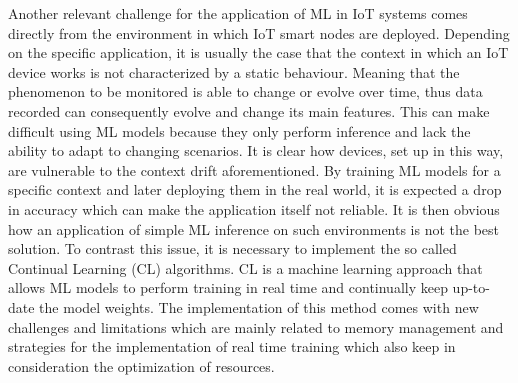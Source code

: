 \documentclass[12pt]{report}
\begin{document}
Another relevant challenge for the application of ML in IoT systems comes directly from the environment in which IoT smart nodes are deployed. Depending on the specific application, it is usually the case that the context in which an IoT device works is not characterized by a static behaviour. Meaning that the phenomenon to be monitored is able to change or evolve over time, thus data recorded can consequently evolve and change its main features. This can make difficult using ML models because they only perform inference and lack the ability to adapt to changing scenarios. It is clear how devices, set up in this way, are vulnerable to the context drift aforementioned.
By training ML models for a specific context and later deploying them in the real world, it is expected a drop in accuracy which can make the application itself not reliable. It is then obvious how an application of simple ML inference on such environments is not the best solution. To contrast this issue, it is necessary to implement the so called Continual Learning (CL) algorithms. CL is a machine learning approach that allows ML models to perform training in real time and continually keep up-to-date the model weights. The implementation of this method comes with new challenges and limitations which are mainly related to memory management and strategies for the implementation of real time training which also keep in consideration the optimization of resources.
\bigskip
\end{document}
